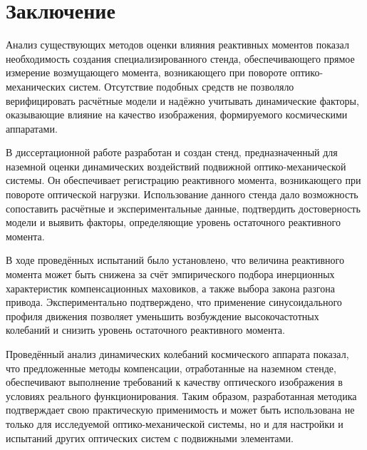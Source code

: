 \chapter*{Заключение}                       %


Анализ существующих методов оценки влияния реактивных моментов показал необходимость создания специализированного стенда, обеспечивающего прямое измерение возмущающего момента, возникающего при повороте оптико-механических систем. Отсутствие подобных средств не позволяло верифицировать расчётные модели и надёжно учитывать динамические факторы, оказывающие влияние на качество изображения, формируемого космическими аппаратами.

В диссертационной работе разработан и создан стенд, предназначенный для наземной оценки динамических воздействий подвижной оптико-механической системы. Он обеспечивает регистрацию реактивного момента, возникающего при повороте оптической нагрузки. Использование данного стенда дало возможность сопоставить расчётные и экспериментальные данные, подтвердить достоверность модели и выявить факторы, определяющие уровень остаточного реактивного момента.

В ходе проведённых испытаний было установлено, что величина реактивного момента может быть снижена за счёт эмпирического подбора инерционных характеристик компенсационных маховиков, а также выбора закона разгона привода. Экспериментально подтверждено, что применение синусоидального профиля движения позволяет уменьшить возбуждение высокочастотных колебаний и снизить уровень остаточного реактивного момента. 

Проведённый анализ динамических колебаний космического аппарата показал, что предложенные методы компенсации, отработанные на наземном стенде, обеспечивают выполнение требований к качеству оптического изображения в условиях реального функционирования. Таким образом, разработанная методика подтверждает свою практическую применимость и может быть использована не только для исследуемой оптико-механической системы, но и для настройки и испытаний других оптических систем с подвижными элементами.